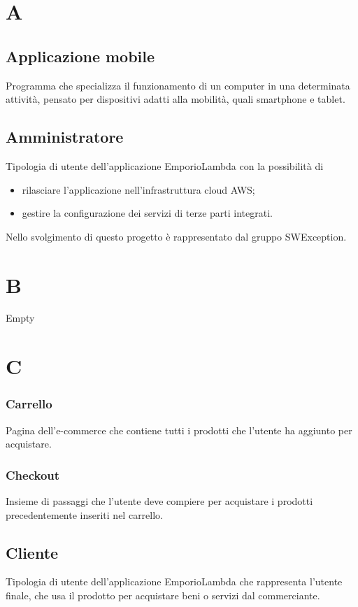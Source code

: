 \section*{A}
\subsection*{Applicazione mobile}
Programma che specializza il funzionamento di un computer in una determinata attività,
pensato per dispositivi adatti alla mobilità, quali smartphone e tablet.

\subsection*{Amministratore}
Tipologia di utente dell'applicazione EmporioLambda con la possibilità di
\begin{itemize}
    \item rilasciare l'applicazione nell'infrastruttura cloud AWS;
    \item gestire la configurazione dei servizi di terze parti integrati.
\end{itemize}
Nello svolgimento di questo progetto è rappresentato dal gruppo SWException.

\section*{B}
Empty

\section*{C}
\subsubsection*{Carrello}
Pagina dell'e-commerce che contiene tutti i prodotti che l'utente ha aggiunto per acquistare.

\subsubsection*{Checkout}
Insieme di passaggi che l'utente deve compiere per acquistare i prodotti precedentemente inseriti nel carrello.

\subsection*{Cliente}
Tipologia di utente dell'applicazione EmporioLambda che rappresenta l'utente finale, che usa
il prodotto per acquistare beni o servizi dal commerciante.

